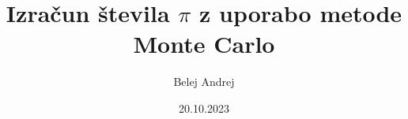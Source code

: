 \title[Title Short]{Izračun števila $\pi$ z uporabo metode Monte Carlo}
\author[Name]{Belej Andrej}
\date[]{20.10.2023}